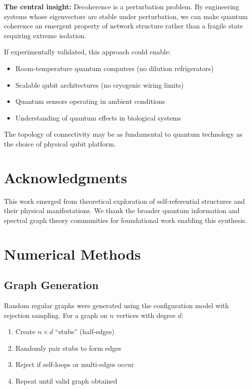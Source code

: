 \documentclass[11pt,a4paper]{article}
\theoremstyle{plain}
\theoremstyle{definition}
\theoremstyle{remark}
\begin{document}
\textbf{The central insight:} Decoherence is a perturbation problem. By engineering systems whose eigenvectors are stable under perturbation, we can make quantum coherence an emergent property of network structure rather than a fragile state requiring extreme isolation.

If experimentally validated, this approach could enable:
\begin{itemize}
    \item Room-temperature quantum computers (no dilution refrigerators)
    \item Scalable qubit architectures (no cryogenic wiring limits)
    \item Quantum sensors operating in ambient conditions
    \item Understanding of quantum effects in biological systems
\end{itemize}

The topology of connectivity may be as fundamental to quantum technology as the choice of physical qubit platform.

\section*{Acknowledgments}

This work emerged from theoretical exploration of self-referential structures and their physical manifestations. We thank the broader quantum information and spectral graph theory communities for foundational work enabling this synthesis.

\appendix
\section{Numerical Methods}

\subsection{Graph Generation}

Random regular graphs were generated using the configuration model with rejection sampling. For a graph on $n$ vertices with degree $d$:

\begin{enumerate}
    \item Create $n \times d$ ``stubs'' (half-edges)
    \item Randomly pair stubs to form edges
    \item Reject if self-loops or multi-edges occur
    \item Repeat until valid graph obtained
\end{enumerate}
\end{document}
